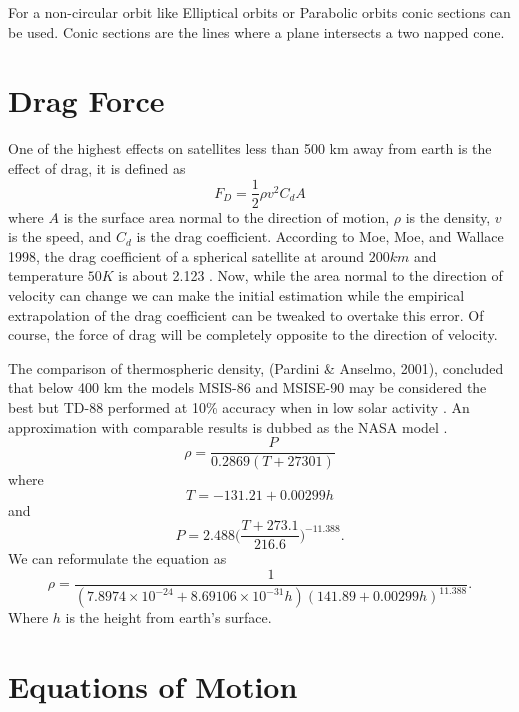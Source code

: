 For a non-circular orbit like Elliptical orbits or Parabolic orbits conic sections can be used. Conic sections are the lines where a plane intersects a two napped cone.

\section{Drag Force}

One of the highest effects on satellites less than 500 km away from earth is the effect of drag, it is defined as $$F_D=\frac{1}{2}\rho v^2 C_d A$$ where $A$ is the surface area normal to the direction of motion, $\rho$ is the density, $v$ is the speed, and $C_d$ is the drag coefficient. According to Moe, Moe, and Wallace 1998, the drag coefficient of a spherical satellite at around $200km$ and temperature $50K$ is about 2.123 \cite{moe_moe_wallace_1998}. Now, while the area normal to the direction of velocity can change we can make the initial estimation while the empirical extrapolation of the drag coefficient can be tweaked to overtake this error. Of course, the force of drag will be completely opposite to the direction of velocity.

The comparison of thermospheric density, (Pardini \& Anselmo, 2001), concluded that below 400 km the models MSIS-86 and MSISE-90 may be considered the best but TD-88 performed at 10\% accuracy when in low solar activity \cite{pardini_anselmo_2001}. An approximation with comparable results is dubbed as the NASA model \cite{brito_celestino_moraes_2015}\cite{nasa}.
\begin{equation}
\rho=\frac{P}{0.2869(T+27301)}
\end{equation} where $$T=-131.21+0.00299h$$ and $$P=2.488\bigg(\frac{T+273.1}{216.6}\bigg)^{-11.388}.$$
We can reformulate the equation as 
\begin{equation}
\rho=\frac{1}{(7.8974\times10^{-24}+8.69106\times10^{-31}h)(141.89+0.00299h)^{11.388}}.
\end{equation} Where $h$ is the height from earth's surface.

\section{Equations of Motion}

